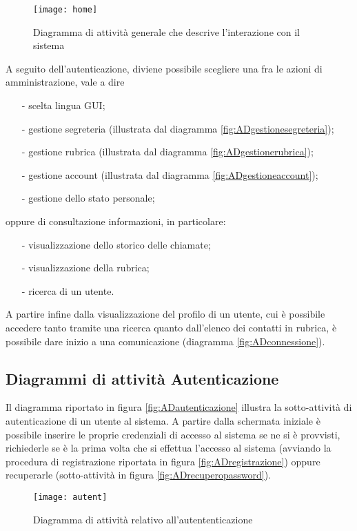 \begin{figure}[H]
\centering
\texttt{[image: home]}
\caption{Diagramma di attività generale che descrive l'interazione con il sistema}\label{fig:ADhome}
\end{figure}

A seguito dell'autenticazione, diviene possibile scegliere una fra le azioni di amministrazione, vale a dire
\begin{itemize}[noitemsep,nolistsep]
  \item[-] scelta lingua GUI;
  \item[-] gestione segreteria (illustrata dal diagramma \ref{fig:ADgestionesegreteria});
  \item[-] gestione rubrica (illustrata dal diagramma \ref{fig:ADgestionerubrica});
  \item[-] gestione account (illustrata dal diagramma \ref{fig:ADgestioneaccount});
  \item[-] gestione dello stato personale;
\end{itemize}
oppure di consultazione informazioni, in particolare:
\begin{itemize}[noitemsep,nolistsep]
  \item[-] visualizzazione dello storico delle chiamate;
  \item[-] visualizzazione della rubrica;
  \item[-] ricerca di un utente.
\end{itemize}

A partire infine dalla visualizzazione del profilo di un utente, cui è possibile accedere tanto tramite una ricerca quanto dall'elenco dei contatti in rubrica, è possibile dare inizio a una comunicazione (diagramma \vref{fig:ADconnessione}).

\subsection{Diagrammi di attività Autenticazione}
Il diagramma riportato in figura \vref{fig:ADautenticazione} illustra la sotto-attività di autenticazione di un utente al sistema. A partire dalla schermata iniziale è possibile inserire le proprie credenziali di accesso al sistema se ne si è provvisti, richiederle se è la prima volta che si effettua l'accesso al sistema (avviando la procedura di registrazione riportata in figura \ref{fig:ADregistrazione}) oppure recuperarle (sotto-attività in figura \vref{fig:ADrecuperopassword}).

\begin{figure}[H]
  \centering
  \texttt{[image: autent]}
  \caption{Diagramma di attività relativo all'autententicazione}\label{fig:ADautenticazione}
\end{figure}

